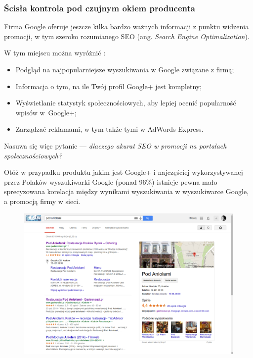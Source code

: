 \subsubsection{Ścisła kontrola pod czujnym okiem producenta}
Firma Google oferuje jeszcze kilka bardzo ważnych informacji z punktu widzenia promocji, w tym szeroko rozumianego SEO (ang. \textit{Search Engine Optimalization}).

W tym miejscu można wyróżnić \cite{url:google-plus-firmy-panel-google}: 

\begin{itemize}
\item Podgląd na najpopularniejsze wyszukiwania w Google związane z firmą;
\item Informacja o tym, na ile Twój profil Google+ jest kompletny;
\item Wyświetlanie statystyk społecznościowych, aby lepiej ocenić popularność wpisów w~Google+;
\item Zarządzać reklamami, w tym także tymi w AdWords Express.
\end{itemize}

Nasuwa się więc pytanie --- \emph{dlaczego akurat SEO w promocji na portalach społecznościowych?}

Otóż w przypadku produktu jakim jest Google+ i najczęściej wykorzystywanej przez Polaków wyszukiwarki Google (ponad 96\%) istnieje pewna mało sprecyzowana korelacja między wynikami wyszukiwania w wyszukiwarce Google, a promocją firmy w sieci. 

\begin{figure}[!h]
\centering
    \scalebox{0.32}
    {
        \includegraphics{images/search-result-company-in-google-search-engine.png}
    }
    \label{fig:search-result-company-in-google-search-engine}
\end{figure}

